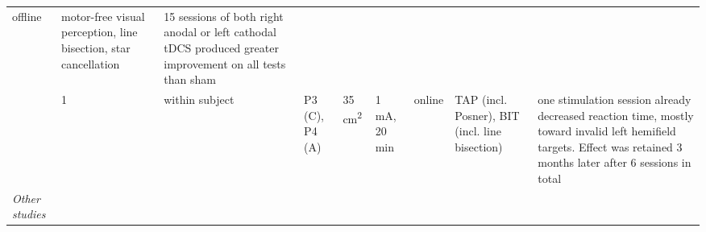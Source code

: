 \documentclass[11pt,english,]{memoir}
\begin{document}
\begin{longtable}[]{@{}lllllllll@{}}
\begin{minipage}[t]{0.04\columnwidth}
offline\strut
\end{minipage} & \begin{minipage}[t]{0.10\columnwidth}\raggedright
motor-free visual
perception, line
bisection, star
cancellation\strut
\end{minipage} & \begin{minipage}[t]{0.28\columnwidth}\raggedright
15 sessions of both right anodal or left cathodal tDCS
produced greater improvement on all tests than sham\strut
\end{minipage}\tabularnewline
\begin{minipage}[t]{0.09\columnwidth}\raggedright
\textcite{Brem2014}\strut
\end{minipage} & \begin{minipage}[t]{0.02\columnwidth}\raggedright
1\strut
\end{minipage} & \begin{minipage}[t]{0.04\columnwidth}\raggedright
within
subject\strut
\end{minipage} & \begin{minipage}[t]{0.10\columnwidth}\raggedright
P3 (C), P4 (A)\strut
\end{minipage} & \begin{minipage}[t]{0.04\columnwidth}\raggedright
35
cm\textsuperscript{2}\strut
\end{minipage} & \begin{minipage}[t]{0.04\columnwidth}\raggedright
1 mA,
20 min\strut
\end{minipage} & \begin{minipage}[t]{0.04\columnwidth}\raggedright
online\strut
\end{minipage} & \begin{minipage}[t]{0.10\columnwidth}\raggedright
TAP (incl. Posner),
BIT (incl. line
bisection)\strut
\end{minipage} & \begin{minipage}[t]{0.28\columnwidth}\raggedright
one stimulation session already decreased reaction time,
mostly toward invalid left hemifield targets. Effect was
retained 3 months later after 6 sessions in total\strut
\end{minipage}\tabularnewline
\begin{minipage}[t]{0.09\columnwidth}\raggedright
\emph{Other studies}\strut
\end{minipage} & \begin{minipage}[t]{0.02\columnwidth}\raggedright
\strut
\end{minipage} & \begin{minipage}[t]{0.04\columnwidth}\raggedright

\end{minipage}
\end{longtable}
\end{document}
